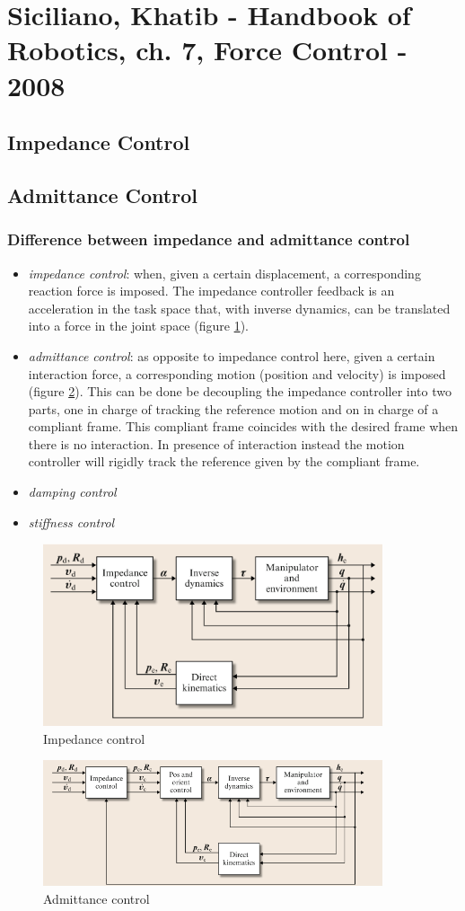 \section{Siciliano, Khatib - Handbook of Robotics, ch. 7, Force Control - 2008}
\subsection*{Impedance Control}
\subsection*{Admittance Control}
\subsubsection*{Difference between impedance and admittance control}

\begin{itemize}
\item \textit{impedance control}: when, given a certain displacement, a corresponding reaction force is imposed. The impedance controller feedback is an acceleration in the task space that, with inverse dynamics, can be translated into a force in the joint space (figure \ref{ImpContr}).
\item \textit{admittance control}: as opposite to impedance control here, given a certain interaction force, a corresponding motion (position and velocity) is imposed (figure \ref{admitContr}). This can be done be decoupling the impedance controller into two parts, one in charge of tracking the reference motion and on in charge of a compliant frame. This compliant frame coincides with the desired frame when there is no interaction. In presence of interaction instead the motion controller will rigidly track the reference given by the compliant frame.
\item \textit{damping control}
\item \textit{stiffness control}
\end{itemize}

\begin{figure}[h]
  \centering
  \includegraphics[width=100mm]{ImpedanceControl}
  \caption{Impedance control}
  \label{ImpContr}
\end{figure}
\begin{figure}[h]
  \centering
  \includegraphics[width=100mm]{AdmittanceControl}
  \caption{Admittance control}
  \label{admitContr}
\end{figure}